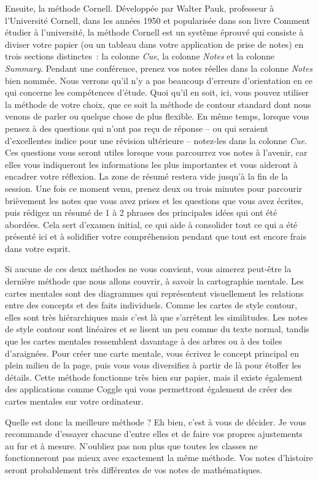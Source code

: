Ensuite, la méthode Cornell. Développée par Walter Pauk, professeur à
l'Université Cornell, dans les années 1950 et popularisée dans son livre
Comment étudier à l'université, la méthode Cornell est un système
éprouvé qui consiste à diviser votre papier (ou un tableau dans votre
application de prise de notes) en trois sections distinctes~: la colonne
\emph{Cue}, la colonne \emph{Notes} et la colonne \emph{Summary}.
Pendant une conférence, prenez vos notes réelles dans la colonne
\emph{Notes} bien nommée. Nous verrons qu'il n'y a pas beaucoup
d'erreurs d'orientation en ce qui concerne les compétences d'étude. Quoi
qu'il en soit, ici, vous pouvez utiliser la méthode de votre choix, que
ce soit la méthode de contour standard dont nous venons de parler ou
quelque chose de plus flexible. En même temps, lorsque vous pensez à des
questions qui n'ont pas reçu de réponse -- ou qui seraient d'excellentes
indice pour une révision ultérieure -- notez-les dans la colonne
\emph{Cue}. Ces questions vous seront utiles lorsque vous parcourrez vos
notes à l'avenir, car elles vous indiqueront les informations les plus
importantes et vous aideront à encadrer votre réflexion. La zone de
résumé restera vide jusqu'à la fin de la session. Une fois ce moment
venu, prenez deux ou trois minutes pour parcourir brièvement les notes
que vous avez prises et les questions que vous avez écrites, puis
rédigez un résumé de 1 à 2 phrases des principales idées qui ont été
abordées. Cela sert d'examen initial, ce qui aide à consolider tout ce
qui a été présenté ici et à solidifier votre compréhension pendant que
tout est encore frais dans votre esprit.

Si aucune de ces deux méthodes ne vous convient, vous aimerez peut-être
la dernière méthode que nous allons couvrir, à savoir la cartographie
mentale. Les cartes mentales sont des diagrammes qui représentent
visuellement les relations entre des concepts et des faits individuels.
Comme les cartes de style contour, elles sont très hiérarchiques mais
c'est là que s'arrêtent les similitudes. Les notes de style contour sont
linéaires et se lisent un peu comme du texte normal, tandis que les
cartes mentales ressemblent davantage à des arbres ou à des toiles
d'araignées. Pour créer une carte mentale, vous écrivez le concept
principal en plein milieu de la page, puis vous vous diversifiez à
partir de là pour étoffer les détails. Cette méthode fonctionne très
bien sur papier, mais il existe également des applications comme Coggle
qui vous permettront également de créer des cartes mentales sur votre
ordinateur.

Quelle est donc la meilleure méthode ? Eh bien, c'est à vous de décider.
Je vous recommande d'essayer chacune d'entre elles et de faire vos
propres ajustements au fur et à mesure. N'oubliez pas non plus que
toutes les classes ne fonctionneront pas mieux avec exactement la même
méthode. Vos notes d'histoire seront probablement très différentes de
vos notes de mathématiques.
